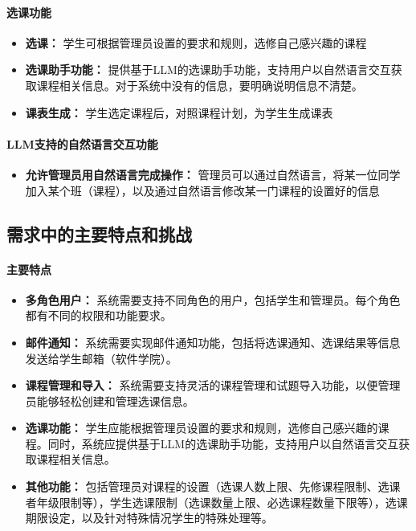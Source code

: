 \documentclass{article}
\begin{document}
\paragraph{选课功能}
\begin{itemize}
	\item \textbf{选课：} 学生可根据管理员设置的要求和规则，选修自己感兴趣的课程
	\item \textbf{选课助手功能：} 提供基于LLM的选课助手功能，支持用户以自然语言交互获取课程相关信息。对于系统中没有的信息，要明确说明信息不清楚。
	\item \textbf{课表生成：} 学生选定课程后，对照课程计划，为学生生成课表
\end{itemize}

\paragraph{LLM支持的自然语言交互功能}
\begin{itemize}
	\item \textbf{允许管理员用自然语言完成操作：} 管理员可以通过自然语言，将某一位同学加入某个班（课程），以及通过自然语言修改某一门课程的设置好的信息
\end{itemize}


\subsection{需求中的主要特点和挑战}
\paragraph{主要特点}
\begin{itemize}
	\item \textbf{多角色用户：} 系统需要支持不同角色的用户，包括学生和管理员。每个角色都有不同的权限和功能要求。
	\item \textbf{邮件通知：} 系统需要实现邮件通知功能，包括将选课通知、选课结果等信息发送给学生邮箱（软件学院）。
	\item \textbf{课程管理和导入：} 系统需要支持灵活的课程管理和试题导入功能，以便管理员能够轻松创建和管理选课信息。
	\item \textbf{选课功能：} 学生应能根据管理员设置的要求和规则，选修自己感兴趣的课程。同时，系统应提供基于LLM的选课助手功能，支持用户以自然语言交互获取课程相关信息。
	\item \textbf{其他功能：} 包括管理员对课程的设置（选课人数上限、先修课程限制、选课者年级限制等），学生选课限制（选课数量上限、必选课程数量下限等），选课期限设定，以及针对特殊情况学生的特殊处理等。
\end{itemize}
\end{document}
